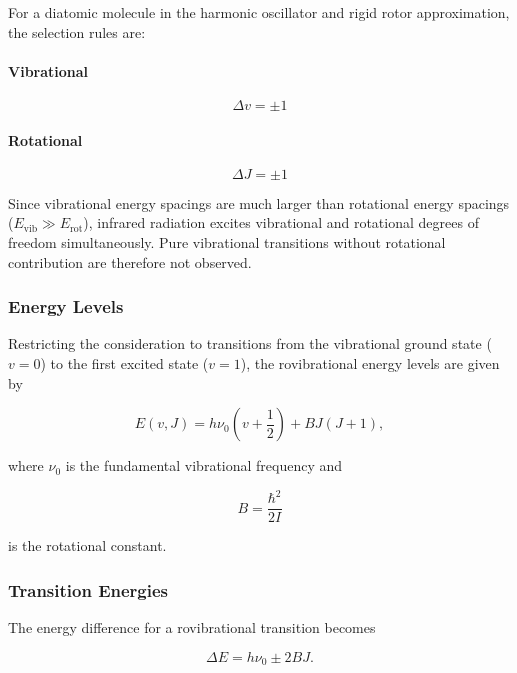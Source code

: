 For a diatomic molecule in the harmonic oscillator and rigid rotor
approximation, the selection rules are:

\paragraph{Vibrational}
\begin{equation}
\Delta v = \pm 1
\end{equation}

\paragraph{Rotational}
\begin{equation}
\Delta J = \pm 1
\end{equation}

Since vibrational energy spacings are much larger than rotational
energy spacings ($E_{\text{vib}} \gg E_{\text{rot}}$), infrared radiation
excites vibrational and rotational degrees of freedom simultaneously.
Pure vibrational transitions without rotational contribution are
therefore not observed.

\subsubsection*{Energy Levels}

Restricting the consideration to transitions from the vibrational
ground state ($v=0$) to the first excited state ($v=1$), the
rovibrational energy levels are given by

\begin{equation}
E(v,J)
=
h \nu_0 \left(v + \frac{1}{2}\right)
+
B J(J+1),
\end{equation}

where $\nu_0$ is the fundamental vibrational frequency and

\begin{equation}
B = \frac{\hbar^2}{2I}
\label{equation: MOI}
\end{equation}


is the rotational constant.

\subsubsection*{Transition Energies}

The energy difference for a rovibrational transition becomes

\begin{equation}
    \Delta E = h\nu_0 \pm 2B J.
\end{equation}


